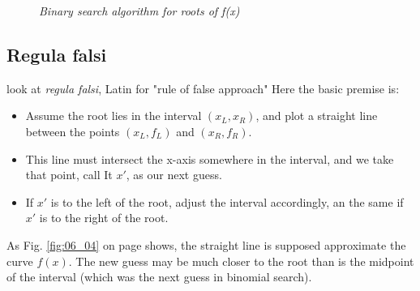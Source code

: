 \begin{figure}
    \caption{\textit{Binary search algorithm for roots of f(x)}}
    \label{fig:06_03}
\end{figure}

\subsection{Regula falsi}

 look at \textit{regula falsi}, Latin for "rule of false approach" Here the basic premise is:

\begin{itemize}
    \item Assume the root lies in the interval $(x_L, x_R)$, and plot a straight line between the points $(x_L, f_L)$ and $(x_R, f_R)$.

    \item This line must intersect the x-axis somewhere in the interval, and we take that point, call It $x'$, as our next guess.

    \item If $x'$ is to the left of the root, adjust the interval accordingly, an the same if $x'$ is to the right of the root.
\end{itemize}

As Fig. \ref{fig:06_04} on page \pageref{fig:06_04} shows, the straight line is supposed
approximate the curve $f(x)$. The new guess may be much closer to the root than is the midpoint of the interval (which was the next guess in binomial search).

